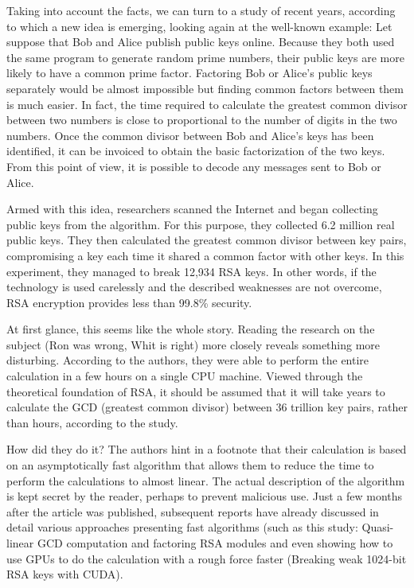\documentclass[runningheads]{llncs}
\begin{document}
Taking into account the facts, we can turn to a study of recent years, according to which a new idea is emerging, looking again at the well-known example: Let suppose that Bob and Alice publish public keys online. Because they both used the same program to generate random prime numbers, their public keys are more likely to have a common prime factor. Factoring Bob or Alice's public keys separately would be almost impossible but finding common factors between them is much easier. In fact, the time required to calculate the greatest common divisor between two numbers is close to proportional to the number of digits in the two numbers. Once the common divisor between Bob and Alice's keys has been identified, it can be invoiced to obtain the basic factorization of the two keys. From this point of view, it is possible to decode any messages sent to Bob or Alice.

Armed with this idea, researchers scanned the Internet and began collecting public keys from the algorithm. For this purpose, they collected 6.2 million real public keys. They then calculated the greatest common divisor between key pairs, compromising a key each time it shared a common factor with other keys. In this experiment, they managed to break 12,934 RSA keys. In other words, if the technology is used carelessly and the described weaknesses are not overcome, RSA encryption provides less than 99.8\% security. 

At first glance, this seems like the whole story. Reading the research on the subject (Ron was wrong, Whit is right) more closely reveals something more disturbing. According to the authors, they were able to perform the entire calculation in a few hours on a single CPU machine. Viewed through the theoretical foundation of RSA, it should be assumed that it will take years to calculate the GCD (greatest common divisor) between 36 trillion key pairs, rather than hours, according to the study.

How did they do it? The authors hint in a footnote that their calculation is based on an asymptotically fast algorithm that allows them to reduce the time to perform the calculations to almost linear. The actual description of the algorithm is kept secret by the reader, perhaps to prevent malicious use. Just a few months after the article was published, subsequent reports have already discussed in detail various approaches presenting fast algorithms (such as this study: Quasi-linear GCD computation and factoring RSA modules and even showing how to use GPUs to do the calculation with a rough force faster (Breaking weak 1024-bit RSA keys with CUDA). 
\end{document}
